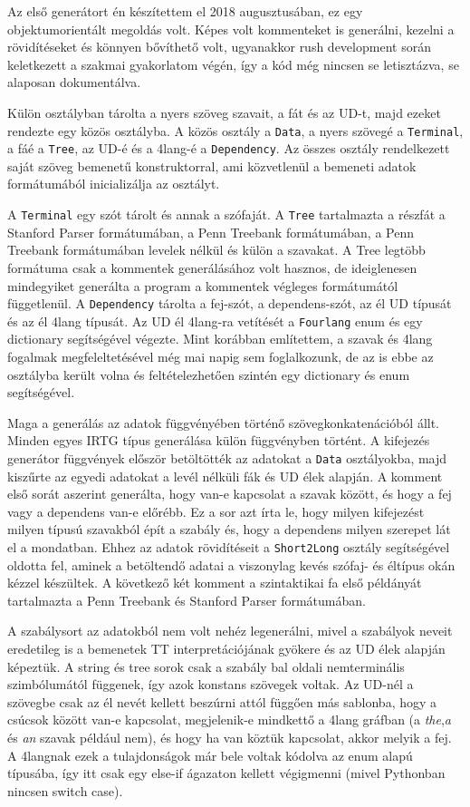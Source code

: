 Az első generátort én készítettem el 2018 augusztusában, ez egy objektumorientált megoldás volt. 
Képes volt kommenteket is generálni, kezelni a rövidítéseket és könnyen bővíthető volt, ugyanakkor rush development során keletkezett a szakmai gyakorlatom végén, így a kód még nincsen se letisztázva, se alaposan dokumentálva.

Külön osztályban tárolta a nyers szöveg szavait, a fát és az UD-t, majd ezeket rendezte egy közös osztályba. 
A közös osztály a \texttt{Data}, a nyers szövegé a \texttt{Terminal}, a fáé a \texttt{Tree}, az UD-é és a 4lang-é a \texttt{Dependency}. 
Az összes osztály rendelkezett saját szöveg bemenetű konstruktorral, ami közvetlenül a bemeneti adatok formátumából inicializálja az osztályt.

A \texttt{Terminal} egy szót tárolt és annak a szófaját. 
A \texttt{Tree} tartalmazta a részfát a Stanford Parser formátumában, a Penn Treebank formátumában, a Penn Treebank formátumában levelek nélkül és külön a szavakat. 
A Tree legtöbb formátuma csak a kommentek generálásához volt hasznos, de ideiglenesen mindegyiket generálta a program a kommentek végleges formátumától függetlenül. 
A \texttt{Dependency} tárolta a fej-szót, a dependens-szót, az él UD típusát és az él 4lang típusát. 
Az UD él 4lang-ra vetítését a \texttt{Fourlang} enum és egy dictionary segítségével végezte. 
Mint korábban említettem, a szavak és 4lang fogalmak megfeleltetésével még mai napig sem foglalkozunk, de az is ebbe az osztályba került volna és feltételezhetően szintén egy dictionary és enum segítségével.

Maga a generálás az adatok függvényében történő szövegkonkatenációból állt.
Minden egyes IRTG típus generálása külön függvényben történt.
A kifejezés generátor függvények először betöltötték az adatokat a \texttt{Data} osztályokba, majd kiszűrte az egyedi adatokat a levél nélküli fák és UD élek alapján. 
A komment első sorát aszerint generálta, hogy van-e kapcsolat a szavak között, és hogy a fej vagy a dependens van-e előrébb. 
Ez a sor azt írta le, hogy milyen kifejezést milyen típusú szavakból épít a szabály és, hogy a dependens milyen szerepet lát el a mondatban. 
Ehhez az adatok rövidítéseit a \texttt{Short2Long} osztály segítségével oldotta fel, aminek a betöltendő adatai  a viszonylag kevés szófaj- és éltípus okán kézzel készültek. 
A következő két komment a szintaktikai fa első példányát tartalmazta a Penn Treebank és Stanford Parser formátumában. 

A szabálysort az adatokból nem volt nehéz legenerálni, mivel a szabályok neveit eredetileg is a bemenetek TT interpretációjának gyökere és az UD élek alapján képeztük. 
A string és tree sorok csak a szabály bal oldali nemterminális szimbólumától függenek, így azok konstans szövegek voltak. 
Az UD-nél a szövegbe csak az él nevét kellett beszúrni attól függően más sablonba, hogy a csúcsok között van-e kapcsolat, megjelenik-e mindkettő a 4lang gráfban (a \textit{the},\textit{a} és \textit{an} szavak például nem), és hogy ha van köztük kapcsolat, akkor melyik a fej. 
A 4langnak ezek a tulajdonságok már bele voltak kódolva az enum alapú típusába, így itt csak egy else-if ágazaton kellett végigmenni (mivel Pythonban nincsen switch case).

